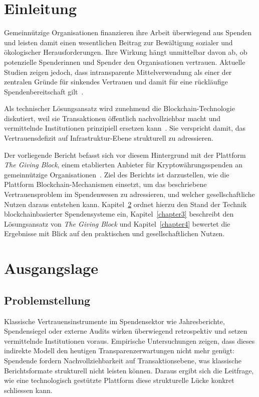 

\vspace*{-3em}
\chapter{Einleitung}

Gemeinnützige Organisationen finanzieren ihre Arbeit überwiegend aus Spenden und leisten damit einen wesentlichen Beitrag zur Bewältigung sozialer und ökologischer Herausforderungen. Ihre Wirkung hängt unmittelbar davon ab, ob potenzielle Spenderinnen und Spender den Organisationen vertrauen. Aktuelle Studien zeigen jedoch, dass intransparente Mittelverwendung als einer der zentralen Gründe für sinkendes Vertrauen und damit für eine rückläufige Spendenbereitschaft gilt~\cite{SUNG2023103812}.

Als technischer Lösungsansatz wird zunehmend die Blockchain-Technologie diskutiert, weil sie Transaktionen öffentlich nachvollziehbar macht und vermittelnde Institutionen prinzipiell ersetzen kann~\cite{Teng2021}. Sie verspricht damit, das Vertrauensdefizit auf Infrastruktur-Ebene strukturell zu adressieren.

Der vorliegende Bericht befasst sich vor diesem Hintergrund mit der Plattform \emph{The Giving Block}, einem etablierten Anbieter für Kryptowährungsspenden an gemeinnützige Organisationen~\cite{givingblock}. Ziel des Berichts ist darzustellen, wie die Plattform Blockchain-Mechanismen einsetzt, um das beschriebene Vertrauensproblem im Spendenwesen zu adressieren, und welcher gesellschaftliche Nutzen daraus entstehen kann. Kapitel~\ref{chapter2} ordnet hierzu den Stand der Technik blockchainbasierter Spendensysteme ein, Kapitel~\ref{chapter3} beschreibt den Lösungsansatz von \emph{The Giving Block} und Kapitel~\ref{chapter4} bewertet die Ergebnisse mit Blick auf den praktischen und gesellschaftlichen Nutzen.


\chapter{Ausgangslage}
\label{chapter2}

\section{Problemstellung}
Klassische Vertrauensinstrumente im Spendensektor wie Jahresberichte, Spendensiegel oder externe Audits wirken überwiegend retrospektiv und setzen vermittelnde Institutionen voraus. Empirische Untersuchungen zeigen, dass dieses indirekte Modell den heutigen Transparenzerwartungen nicht mehr genügt: Spendende fordern Nachvollziehbarkeit auf Transaktionsebene, was klassische Berichtsformate strukturell nicht leisten können. Daraus ergibt sich die Leitfrage, wie eine technologisch gestützte Plattform diese strukturelle Lücke konkret schliessen kann.

